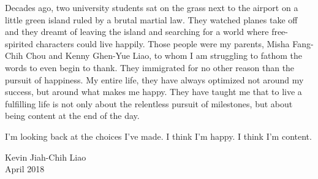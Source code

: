 \begin{acknowledgements}
Decades ago, two university students sat on the grass next to the airport on a
little green island ruled by a brutal martial law. They watched planes take off
and they dreamt of leaving the island and searching for a world where
free-spirited characters could live happily. Those people were my parents, Misha
Fang-Chih Chou and Kenny Ghen-Yue Liao, to whom I am struggling to fathom the
words to even begin to thank. They immigrated for no other reason than the
pursuit of happiness. My entire life, they have always optimized not around my
success, but around what makes me happy. They have taught me that to live a
fulfilling life is not only about the relentless pursuit of milestones, but
about being content at the end of the day. 

I'm looking back at the choices I've made. I think I'm happy. I think I'm
content. 

Kevin Jiah-Chih Liao\\
April 2018

\end{acknowledgements}
